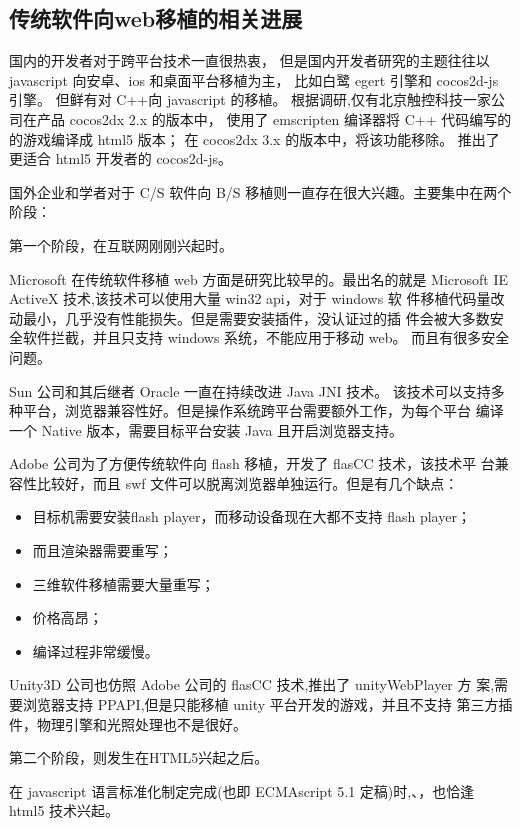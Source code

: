 \subsection{传统软件向web移植的相关进展}

国内的开发者对于跨平台技术一直很热衷，
但是国内开发者研究的主题往往以 javascript 向安卓、ios 和桌面平台移植为主，
比如白鹭 egert 引擎和 cocos2d-js 引擎。
但鲜有对 C++向 javascript 的移植。
根据调研,仅有北京触控科技一家公司在产品 cocos2dx 2.x 的版本中，
使用了 emscripten 编译器将 C++ 代码编写的的游戏编译成 html5 版本；
在 cocos2dx 3.x 的版本中，将该功能移除。
推出了更适合 html5 开发者的 cocos2d-js。

国外企业和学者对于 C/S 软件向 B/S 移植则一直存在很大兴趣。主要集中在两个阶段：

第一个阶段，在互联网刚刚兴起时。

Microsoft 在传统软件移植 web 方面是研究比较早的。最出名的就是
Microsoft IE ActiveX 技术,该技术可以使用大量 win32 api，对于 windows 软
件移植代码量改动最小，几乎没有性能损失。但是需要安装插件，没认证过的插
件会被大多数安全软件拦截，并且只支持 windows 系统，不能应用于移动 web。
而且有很多安全问题。

Sun 公司和其后继者 Oracle 一直在持续改进 Java JNI  技术。
该技术可以支持多种平台，浏览器兼容性好。但是操作系统跨平台需要额外工作，为每个平台
编译一个 Native 版本，需要目标平台安装 Java 且开启浏览器支持。

Adobe 公司为了方便传统软件向 flash 移植，开发了 flasCC 技术，该技术平
台兼容性比较好，而且 swf 文件可以脱离浏览器单独运行。但是有几个缺点：

\begin{itemize}
    \item 目标机需要安装flash player，而移动设备现在大都不支持 flash player；
    \item 而且渲染器需要重写；
    \item 三维软件移植需要大量重写；
    \item 价格高昂；
    \item 编译过程非常缓慢。
\end{itemize}

Unity3D 公司也仿照 Adobe 公司的 flasCC 技术,推出了 unityWebPlayer 方
案,需要浏览器支持 PPAPI,但是只能移植 unity 平台开发的游戏，并且不支持
第三方插件，物理引擎和光照处理也不是很好。

第二个阶段，则发生在HTML5兴起之后。

在 javascript 语言标准化制定完成(也即 ECMAscript 5.1 定稿)时,、，也恰逢
html5 技术兴起。

